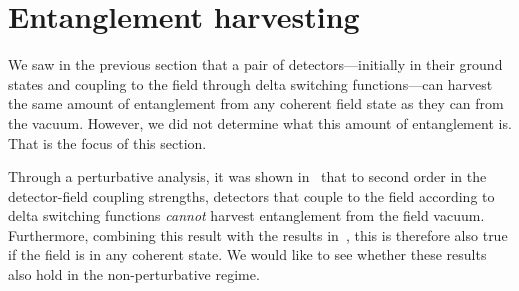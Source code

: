 \documentclass[pra,nofootinbib,floats,aps,twocolumn,tightenlines,superscriptaddress]{revtex4-1}
\begin{document}
\section{Entanglement harvesting}
\label{sec:ent_harv}

We saw in the previous section that a pair of detectors---initially in their ground states and coupling to the field through delta switching functions---can harvest the same amount of entanglement from any coherent field state as they can from the vacuum. However, we did not determine what this amount of entanglement is. That is the focus of this section.

Through a perturbative analysis, it was shown in~\cite{Pozas2017} that to second order in the detector-field coupling strengths, detectors that couple to the field according to delta switching functions \textit{cannot} harvest entanglement from the field vacuum. Furthermore, combining this result with the results in~\cite{Simidzija2017b}, this is therefore also true if the field is in any coherent state. We would like to see whether these results also hold in the non-perturbative regime.
\end{document}
